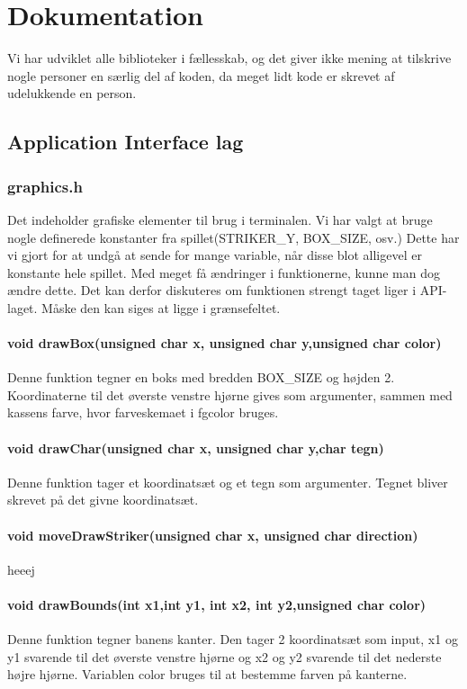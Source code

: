 \section{Dokumentation}
Vi har udviklet alle biblioteker i fællesskab, og det giver ikke mening at tilskrive nogle personer en særlig del af koden, da meget lidt kode er skrevet af udelukkende en person. 
\subsection{Application Interface lag}
\subsubsection{graphics.h}
Det indeholder grafiske elementer til brug i terminalen. Vi har valgt at bruge nogle definerede konstanter fra spillet(STRIKER\_Y, BOX\_SIZE, osv.) Dette har vi gjort for at undgå at sende for mange variable, når disse blot alligevel er konstante hele spillet. Med meget få ændringer i funktionerne, kunne man dog ændre dette. Det kan derfor diskuteres om funktionen strengt taget liger i API-laget. Måske den kan siges at ligge i grænsefeltet.
\paragraph{
void drawBox(unsigned char x, unsigned char y,unsigned char color)}
Denne funktion tegner en boks med bredden BOX\_SIZE og højden 2. Koordinaterne til det øverste venstre hjørne gives som argumenter, sammen med kassens farve, hvor farveskemaet i fgcolor bruges.

\paragraph{void drawChar(unsigned char x, unsigned char y,char tegn)}
Denne funktion tager et koordinatsæt og et tegn som argumenter. Tegnet bliver skrevet på det givne koordinatsæt.

\paragraph{void moveDrawStriker(unsigned char x, unsigned char direction)}
heeej

\paragraph{void drawBounds(int x1,int y1, int x2, int y2,unsigned char color)}
Denne funktion tegner banens kanter. Den tager 2 koordinatsæt som input, x1 og y1 svarende til det øverste venstre hjørne og  x2 og y2 svarende til det nederste højre hjørne. Variablen color bruges til at bestemme farven på kanterne. 

